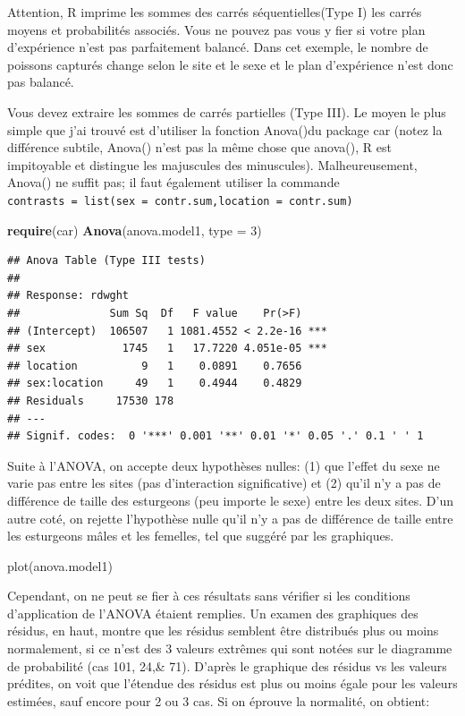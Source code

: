 \documentclass[12pt,]{book}
\makeatletter
\newenvironment{Shaded}{\begin{snugshade}}{\end{snugshade}}
\newcommand{\DataTypeTok}[1]{\textcolor[rgb]{0.27,0.27,0.27}{#1}}
\newcommand{\DecValTok}[1]{\textcolor[rgb]{0.06,0.06,0.06}{#1}}
\newcommand{\KeywordTok}[1]{\textcolor[rgb]{0.27,0.27,0.27}{\textbf{#1}}}
\newcommand{\NormalTok}[1]{#1}
\newenvironment{kframe}{%
\medskip{}
\setlength{\fboxsep}{.8em}
 \def\at@end@of@kframe{}%
 \ifinner\ifhmode%
  \def\at@end@of@kframe{\end{minipage}}%
  \begin{minipage}{\columnwidth}%
 \fi\fi%
 \def\FrameCommand##1{\hskip\@totalleftmargin \hskip-\fboxsep
 \colorbox{shadecolor}{##1}\hskip-\fboxsep
     \hskip-\linewidth \hskip-\@totalleftmargin \hskip\columnwidth}%
 \MakeFramed {\advance\hsize-\width
   \@totalleftmargin\z@ \linewidth\hsize
   \@setminipage}}%
 {\par\unskip\endMakeFramed%
 \at@end@of@kframe}
\newenvironment{rmdblock}[1]
  {
  \begin{itemize}
  \renewcommand{\labelitemi}{
    \raisebox{-.7\height}[0pt][0pt]{
      {\setkeys{Gin}{width=3em,keepaspectratio}\texttt{[image: images/\#1]}}
    }
  }
  \setlength{\fboxsep}{1em}
  \begin{kframe}
  \item
  }
  {
  \end{kframe}
  \end{itemize}
  }
\newenvironment{rmdwarning}
  {\begin{rmdblock}{warning}}
  {\end{rmdblock}}
\makeatother
\begin{document}
\begin{rmdwarning}
Attention, R imprime les sommes des carrés séquentielles(Type I) les carrés moyens et probabilités associés. Vous ne pouvez pas vous y fier si votre plan d'expérience n'est pas parfaitement balancé. Dans cet exemple, le nombre de poissons capturés change selon le site et le sexe et le plan d'expérience n'est donc pas balancé.
\end{rmdwarning}

Vous devez extraire les sommes de carrés partielles (Type III). Le moyen le plus simple que j'ai trouvé est d'utiliser la fonction Anova()du package car (notez la différence subtile, Anova() n'est pas la même chose que anova(), R est impitoyable et distingue les majuscules des minuscules). Malheureusement, Anova() ne suffit pas; il faut également utiliser la commande \texttt{contrasts\ =\ list(sex\ =\ contr.sum,location\ =\ contr.sum)}

\begin{Shaded}
\begin{Highlighting}[]
\KeywordTok{require}\NormalTok{(car)}
\KeywordTok{Anova}\NormalTok{(anova.model1, }\DataTypeTok{type =} \DecValTok{3}\NormalTok{)}
\end{Highlighting}
\end{Shaded}

\begin{verbatim}
## Anova Table (Type III tests)
## 
## Response: rdwght
##              Sum Sq  Df   F value    Pr(>F)    
## (Intercept)  106507   1 1081.4552 < 2.2e-16 ***
## sex            1745   1   17.7220 4.051e-05 ***
## location          9   1    0.0891    0.7656    
## sex:location     49   1    0.4944    0.4829    
## Residuals     17530 178                        
## ---
## Signif. codes:  0 '***' 0.001 '**' 0.01 '*' 0.05 '.' 0.1 ' ' 1
\end{verbatim}

Suite à l'ANOVA, on accepte deux hypothèses nulles: (1) que l'effet du sexe ne varie pas entre les sites (pas d'interaction significative) et (2) qu'il n'y a pas de différence de taille des esturgeons (peu importe le sexe) entre les deux sites. D'un autre coté, on rejette l'hypothèse nulle qu'il n'y a pas de différence de taille entre les esturgeons mâles et les femelles, tel que suggéré par les graphiques.

plot(anova.model1)

Cependant, on ne peut se fier à ces résultats sans vérifier si les conditions d'application de l'ANOVA étaient remplies. Un examen des graphiques des résidus, en haut, montre que les résidus semblent être distribués plus ou moins normalement, si ce n'est des 3 valeurs extrêmes qui sont notées sur le diagramme de probabilité (cas 101, 24,\& 71). D'après le graphique des résidus vs les valeurs prédites, on voit que l'étendue des résidus est plus ou moins égale pour les valeurs estimées, sauf encore pour 2 ou 3 cas. Si on éprouve la normalité, on obtient:
\end{document}
